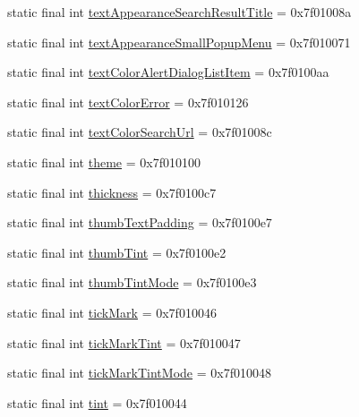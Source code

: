 \begin{CompactItemize}
\item 
static final int \hyperlink{classandroid_1_1support_1_1v4_1_1_r_1_1attr_bd7cb6e16abd4ec1ddf791592de0b8c6}{textAppearanceSearchResultTitle} = 0x7f01008a
\item 
static final int \hyperlink{classandroid_1_1support_1_1v4_1_1_r_1_1attr_400dab9e781d7947213c15adc6de09c6}{textAppearanceSmallPopupMenu} = 0x7f010071
\item 
static final int \hyperlink{classandroid_1_1support_1_1v4_1_1_r_1_1attr_1770aa530759048e6ba971f6a64b3481}{textColorAlertDialogListItem} = 0x7f0100aa
\item 
static final int \hyperlink{classandroid_1_1support_1_1v4_1_1_r_1_1attr_22d002247ac147c3edcb1450f594e9f4}{textColorError} = 0x7f010126
\item 
static final int \hyperlink{classandroid_1_1support_1_1v4_1_1_r_1_1attr_ad6df055025971bb7ffce78163d0b7ae}{textColorSearchUrl} = 0x7f01008c
\item 
static final int \hyperlink{classandroid_1_1support_1_1v4_1_1_r_1_1attr_9c2de200d2e984d5ff7fa88b9204a548}{theme} = 0x7f010100
\item 
static final int \hyperlink{classandroid_1_1support_1_1v4_1_1_r_1_1attr_7ba30267b9eee15bc690aca312f22d61}{thickness} = 0x7f0100c7
\item 
static final int \hyperlink{classandroid_1_1support_1_1v4_1_1_r_1_1attr_916537ade330bf40aec92369791564f2}{thumbTextPadding} = 0x7f0100e7
\item 
static final int \hyperlink{classandroid_1_1support_1_1v4_1_1_r_1_1attr_6e21e127a0682bf5dbc3849767500a8f}{thumbTint} = 0x7f0100e2
\item 
static final int \hyperlink{classandroid_1_1support_1_1v4_1_1_r_1_1attr_3040d16b189e4e4e63eb0ef4f8809f66}{thumbTintMode} = 0x7f0100e3
\item 
static final int \hyperlink{classandroid_1_1support_1_1v4_1_1_r_1_1attr_f564e1f920fde444ea4cf1d71f8e54c6}{tickMark} = 0x7f010046
\item 
static final int \hyperlink{classandroid_1_1support_1_1v4_1_1_r_1_1attr_119016cd4771d79b024fdfdcf6ede753}{tickMarkTint} = 0x7f010047
\item 
static final int \hyperlink{classandroid_1_1support_1_1v4_1_1_r_1_1attr_4f86271c7af7da84aae0d28bfe8da8dc}{tickMarkTintMode} = 0x7f010048
\item 
static final int \hyperlink{classandroid_1_1support_1_1v4_1_1_r_1_1attr_f922e6d64b4da6f7142da6e2b7f26282}{tint} = 0x7f010044
\item 

\end{CompactItemize}
